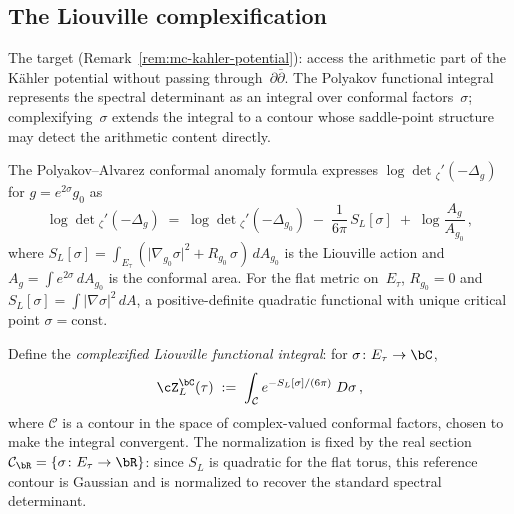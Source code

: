 \subsection{The Liouville complexification}%
\label{subsec:liouville-complexification}%
%

The target (Remark~\ref{rem:mc-kahler-potential}):
access the arithmetic part of the K\"ahler potential without
passing through~$\partial\bar\partial$. The Polyakov functional
integral~\cite{Polyakov1981, Alvarez1983} represents the
spectral determinant as an integral over conformal
factors~$\sigma$; complexifying~$\sigma$ extends the integral
to a contour whose saddle-point structure may detect the
arithmetic content directly.

\begin{construction}%
\label{constr:liouville-complexified}%
%
The Polyakov--Alvarez conformal anomaly formula expresses
$\log\det{}_\zeta'(-\Delta_g)$ for $g = e^{2\sigma}g_0$ as
\begin{equation}\label{eq:polyakov-conformal-anomaly}
 \log\det{}_\zeta'\!(-\Delta_g)
 \;=\;
 \log\det{}_\zeta'\!(-\Delta_{g_0})
 \;-\;
 \frac{1}{6\pi}\,S_L[\sigma]
 \;+\;
 \log\frac{A_g}{A_{g_0}}\,,
\end{equation}
where $S_L[\sigma] = \int_{E_\tau}(\lvert\nabla_{g_0}\sigma
\rvert^2 + R_{g_0}\,\sigma)\,dA_{g_0}$
is the Liouville action and $A_g = \int e^{2\sigma}\,dA_{g_0}$
is the conformal area. For the flat metric on~$E_\tau$,
$R_{g_0} = 0$ and $S_L[\sigma] = \int\lvert\nabla\sigma
\rvert^2\,dA$, a positive-definite quadratic functional with
unique critical point $\sigma = \mathrm{const}$.

Define the \emph{complexified Liouville functional integral}:
for $\sigma\colon E_\tau\to\bC$,
\begin{equation}\label{eq:complexified-liouville-integral}
 \cZ_L^{\bC}(\tau)
 \;:=\;
 \int_{\mathcal{C}}
 e^{-S_L[\sigma]/(6\pi)}\;D\sigma\,,
\end{equation}
where $\mathcal{C}$ is a contour in the space of complex-valued
conformal factors, chosen to make the integral convergent. The
normalization is fixed by the real section
$\mathcal{C}_{\bR} = \{\sigma\colon E_\tau \to\bR\}$: since
$S_L$ is quadratic for the flat torus, this reference contour is
Gaussian and is normalized to recover the standard spectral
determinant.
\end{construction}

